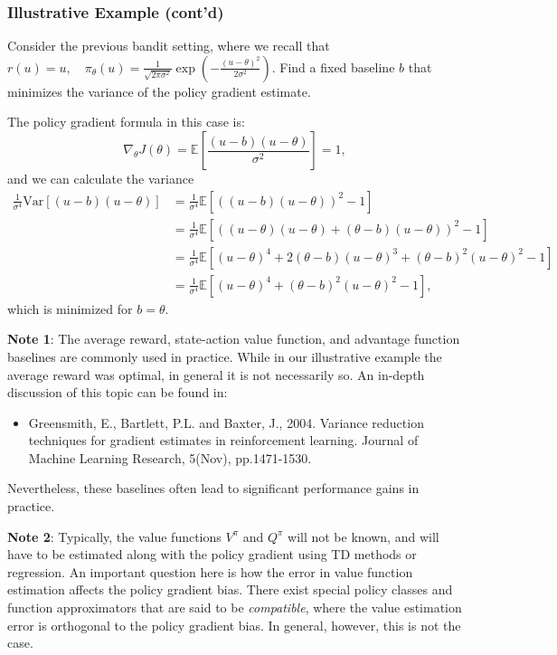 \subsubsection{Illustrative Example (cont'd)}
Consider the previous bandit setting, where we recall that
$        r(u) = u, \quad
        \pi_\theta(u) = \frac{1}{\sqrt{2 \pi \sigma^2}} \exp (- \frac{(u - \theta)^2}{2 \sigma^2}).$
Find a fixed baseline $b$ that minimizes the variance of the policy gradient estimate.

The policy gradient formula in this case is:
\begin{equation*}
        \nabla_\theta J(\theta) = \mathbb{E} \left[\frac{(u-b)(u - \theta)}{\sigma^2}\right] = 1, 
\end{equation*}
and we can calculate the variance
\begin{equation*}
\begin{split}
        \frac{1}{\sigma^4}\textrm{Var}\left[(u-b)(u - \theta)\right]  
        &=\frac{1}{\sigma^4}\mathbb{E}\left[\left((u-b)(u - \theta)\right)^2 - 1\right] \\
        &=\frac{1}{\sigma^4}\mathbb{E}\left[\left((u-\theta)(u - \theta) + (\theta-b)(u - \theta)\right)^2 - 1\right] \\
        &=\frac{1}{\sigma^4}\mathbb{E}\left[(u-\theta)^4 + 2(\theta-b)(u - \theta)^3 + (\theta-b)^2(u - \theta)^2 - 1\right] \\
        &=\frac{1}{\sigma^4}\mathbb{E}\left[(u-\theta)^4 + (\theta-b)^2(u - \theta)^2 - 1\right],
\end{split}
\end{equation*}
which is minimized for $b=\theta$.

\textbf{Note 1}: The average reward, state-action value function, and advantage function baselines are commonly used in practice. While in our illustrative example the average reward was optimal, in general it is not necessarily so. An in-depth discussion of this topic can be found in:  
\begin{itemize}
  \item Greensmith, E., Bartlett, P.L. and Baxter, J., 2004. Variance reduction techniques for gradient estimates in reinforcement learning. Journal of Machine Learning Research, 5(Nov), pp.1471-1530.
\end{itemize}
Nevertheless, these baselines often lead to significant performance gains in practice.

\textbf{Note 2}: Typically, the value functions $V^\pi$ and $Q^\pi$ will not be known, and will have to be estimated along with the policy gradient using TD methods or regression. An important question here is how the error in value function estimation affects the policy gradient bias. There exist special policy classes and function approximators that are said to be \textit{compatible}, where the value estimation error is orthogonal to the policy gradient bias. In general, however, this is not the case. 


